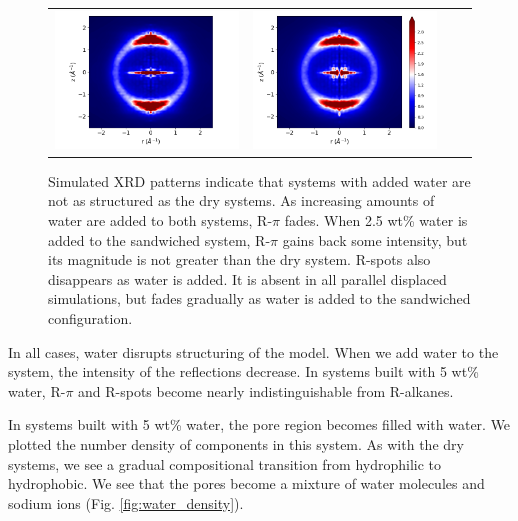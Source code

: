 \documentclass[journal=jpcbfk,manusciprt=article]{achemso}
\begin{document}
\begin{figure}
\begin{tabular}{@{}c@{ }c@{ }c@{ }c@{}}
  	\includegraphics[width=.28\linewidth,trim={1cm 0 1.3cm 0},clip]{solvated_layered_rzplot_25.png}&
  	\includegraphics[width=.325\linewidth]{solvated_layered_rzplot_5.png}\\[-1ex]
  	\end{tabular}
	\caption{Simulated XRD patterns indicate that systems with added water
		are not as structured as the dry systems. As increasing amounts of water are 
		added to both systems, R-$\pi$ fades. When 2.5 wt\% water is added to the
		sandwiched system, R-$\pi$ gains back some intensity, but its magnitude is not
		greater than the dry system. R-spots also disappears as water is added. It is
		absent in all parallel displaced simulations, but fades gradually as water is
		added to the sandwiched configuration.}%
  \label{fig:solvation}

  \end{figure}
 
  In all cases, water disrupts structuring of the model.  When we add water to
  the system, the intensity of the reflections decrease. In systems built with 5
  wt\% water, R-$\pi$ and R-spots become nearly indistinguishable from R-alkanes.

  In systems built with 5 wt\% water, the pore region becomes filled with
  water. We plotted the number density of components in this system. As with the 
  dry systems, we see a gradual compositional transition from hydrophilic to hydrophobic.  
  We see that the pores become a mixture of water molecules and sodium ions (Fig.
  \ref{fig:water_density}). 
  
\end{document}

